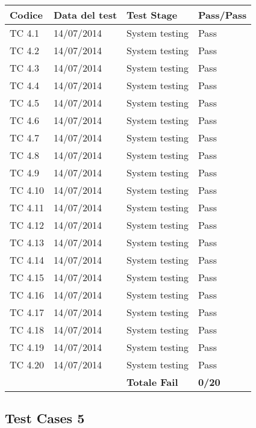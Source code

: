 \begin{tabular}{|p{3cm}|p{3cm}|p{3cm}|p{3cm}|}
	\hline
	\rowcolor{Gray}
	\textbf{Codice} & \textbf{Data del test} & \textbf{Test Stage} & \textbf{Pass/Pass}\tabularnewline
	\hline
	TC 4.1			& 14/07/2014 			& System testing		& Pass \tabularnewline
	\hline
	TC 4.2			& 14/07/2014 			& System testing		& Pass \tabularnewline
	\hline
	TC 4.3			& 14/07/2014 			& System testing		& Pass \tabularnewline
	\hline
	TC 4.4			& 14/07/2014 			& System testing		& Pass \tabularnewline
	\hline
	TC 4.5			& 14/07/2014 			& System testing		& Pass \tabularnewline
	\hline
	TC 4.6			& 14/07/2014 			& System testing		& Pass \tabularnewline
	\hline
	TC 4.7			& 14/07/2014 			& System testing		& Pass \tabularnewline
	\hline
	TC 4.8			& 14/07/2014 			& System testing		& Pass \tabularnewline
	\hline
	TC 4.9			& 14/07/2014 			& System testing		& Pass \tabularnewline
	\hline
	TC 4.10			& 14/07/2014 			& System testing		& Pass \tabularnewline
	\hline
	TC 4.11			& 14/07/2014 			& System testing		& Pass \tabularnewline
	\hline
	TC 4.12			& 14/07/2014 			& System testing		& Pass \tabularnewline
	\hline
	TC 4.13			& 14/07/2014 			& System testing		& Pass \tabularnewline
	\hline
	TC 4.14			& 14/07/2014 			& System testing		& Pass \tabularnewline
	\hline
	TC 4.15			& 14/07/2014 			& System testing		& Pass \tabularnewline
	\hline
	TC 4.16			& 14/07/2014 			& System testing		& Pass \tabularnewline
	\hline
	TC 4.17			& 14/07/2014 			& System testing		& Pass \tabularnewline
	\hline
	TC 4.18			& 14/07/2014 			& System testing		& Pass \tabularnewline
	\hline
	TC 4.19			& 14/07/2014 			& System testing		& Pass \tabularnewline
	\hline
	TC 4.20			& 14/07/2014 			& System testing		& Pass \tabularnewline
	\hline
					& 						& \textbf{Totale Fail}	& \textbf{0/20} \tabularnewline
	\hline
\end{tabular}

\subsection{Test Cases 5}

